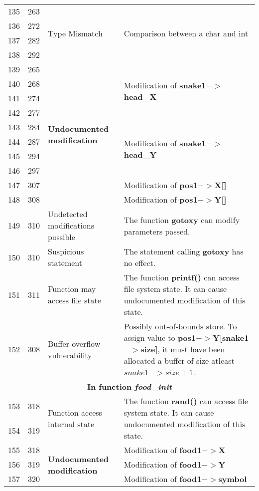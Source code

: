 \documentclass[]{article}
\begin{document}
\begin{longtable}{ |p{0.5cm}|p{0.75cm}|p{3cm}|p{9cm}|  }
		135 & 263 & \multirow{4}{50.0pt}{Type Mismatch} & \multirow{4}{200.0pt}{Comparison between a char and int} \\
		136 & 272 & &  \\
		137 & 282 & & \\
		138 & 292 & & \\
		\hline 
		139 & 265 & \multirow{10}{90.0pt}{\textbf{Undocumented modification}} & \multirow{4}{200.0pt}{Modification of \textbf{snake1$->$head\_X}} \\
		140 & 268 & &  \\
		141 & 274 & &  \\
		142 & 277 & &  \\
		\cline{4-4}
		143 & 284 & & \multirow{4}{200.0pt}{Modification of \textbf{snake1$->$head\_Y}} \\
		144 & 287 & & \\
		145 & 294 & & \\
		146 & 297 & & \\
		\cline{4-4}
		147 & 307 & & Modification of \textbf{pos1$->$X[]} \\
		148 & 308 & & Modification of \textbf{pos1$->$Y[]} \\
		\hline 
		149 & 310 & Undetected modifications possible & The function \textbf{gotoxy} can modify parameters passed. \\
		\hline 
		150 & 310 & Suspicious statement & The statement calling \textbf{gotoxy} has no effect. \\
		\hline 
		151 & 311 & Function may access file state & The function \textbf{printf()} can access file system state. It can cause undocumented modification of this state. \\
		\hline 
		152 & 308 &Buffer overflow vulnerability & Possibly out-of-bounds store. To assign value to \textbf{pos1$->$Y[snake1$->$size]}, it must have been allocated a buffer of size atleast $snake1->size +1$.  \\
		
		\hline 
		\multicolumn{4}{|c|}{\textbf{In function \textit{food\_init}}} \\
		\hline 
		
		153 & 318 & \multirow{2}{120.0pt}{Function access internal state} & \multirow{2}{300.0pt}{The function \textbf{rand()} can access file system state. It can cause undocumented modification of this state.} \\ 
		154 & 319 & & \\
		\hline 
		155 & 318 & \multirow{3}{90.0pt}{\textbf{Undocumented modification}} & Modification of \textbf{food1$->$X} \\
		156 & 319 & &  Modification of \textbf{food1$->$Y} \\
		157 & 320 & &  Modification of \textbf{food1$->$symbol} \\
		

\end{longtable}
\end{document}
